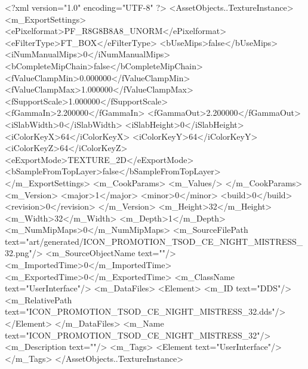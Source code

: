 <?xml version="1.0" encoding="UTF-8" ?>
<AssetObjects..TextureInstance>
	<m_ExportSettings>
		<ePixelformat>PF_R8G8B8A8_UNORM</ePixelformat>
		<eFilterType>FT_BOX</eFilterType>
		<bUseMips>false</bUseMips>
		<iNumManualMips>0</iNumManualMips>
		<bCompleteMipChain>false</bCompleteMipChain>
		<fValueClampMin>0.000000</fValueClampMin>
		<fValueClampMax>1.000000</fValueClampMax>
		<fSupportScale>1.000000</fSupportScale>
		<fGammaIn>2.200000</fGammaIn>
		<fGammaOut>2.200000</fGammaOut>
		<iSlabWidth>0</iSlabWidth>
		<iSlabHeight>0</iSlabHeight>
		<iColorKeyX>64</iColorKeyX>
		<iColorKeyY>64</iColorKeyY>
		<iColorKeyZ>64</iColorKeyZ>
		<eExportMode>TEXTURE_2D</eExportMode>
		<bSampleFromTopLayer>false</bSampleFromTopLayer>
	</m_ExportSettings>
	<m_CookParams>
		<m_Values/>
	</m_CookParams>
	<m_Version>
		<major>1</major>
		<minor>0</minor>
		<build>0</build>
		<revision>0</revision>
	</m_Version>
	<m_Height>32</m_Height>
	<m_Width>32</m_Width>
	<m_Depth>1</m_Depth>
	<m_NumMipMaps>0</m_NumMipMaps>
	<m_SourceFilePath text="art/generated/ICON_PROMOTION_TSOD_CE_NIGHT_MISTRESS_32.png"/>
	<m_SourceObjectName text=""/>
	<m_ImportedTime>0</m_ImportedTime>
	<m_ExportedTime>0</m_ExportedTime>
	<m_ClassName text="UserInterface"/>
	<m_DataFiles>
		<Element>
			<m_ID text="DDS"/>
			<m_RelativePath text="ICON_PROMOTION_TSOD_CE_NIGHT_MISTRESS_32.dds"/>
		</Element>
	</m_DataFiles>
	<m_Name text="ICON_PROMOTION_TSOD_CE_NIGHT_MISTRESS_32"/>
	<m_Description text=""/>
	<m_Tags>
		<Element text="UserInterface"/>
	</m_Tags>
</AssetObjects..TextureInstance>
